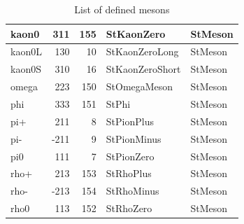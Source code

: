 \documentclass[twoside]{article}
\begin{document}
\begin{table}[htb]
\begin{center}
\begin{tabular}{|l|r|r|l| l |}
         kaon0  & 311   & 155   &           StKaonZero  & StMeson        \\ \hline
        kaon0L  & 130   & 10    &       StKaonZeroLong  & StMeson        \\ \hline
        kaon0S  & 310   & 16    &      StKaonZeroShort  & StMeson        \\ \hline
         omega  & 223   & 150   &         StOmegaMeson  & StMeson        \\ \hline
           phi  & 333   & 151   &                StPhi  & StMeson        \\ \hline
           pi+  & 211   & 8     &           StPionPlus  & StMeson        \\ \hline
           pi-  & -211  & 9     &          StPionMinus  & StMeson        \\ \hline
           pi0  & 111   & 7     &           StPionZero  & StMeson        \\ \hline
          rho+  & 213   & 153   &            StRhoPlus  & StMeson        \\ \hline
          rho-  & -213  & 154   &           StRhoMinus  & StMeson        \\ \hline
          rho0  & 113   & 152   &            StRhoZero  & StMeson        \\ \hline
    \end{tabular}            
    \caption{List of defined mesons}
    \label{tab:mesons}
    \end{center}
\end{table}
\end{document}
